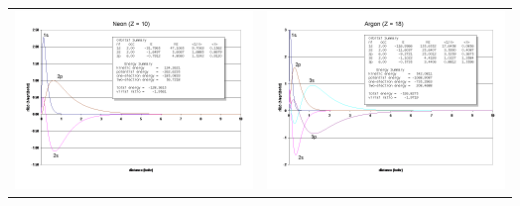 \documentclass[11pt]{article}
\begin{document}
\begin{table}[]
\begin{tabular}{cc}
\includegraphics[scale=0.33]{Images/Slide3.png} & \includegraphics[scale=0.33]{Images/Slide4.png} \\

\end{tabular}
\end{table}
\end{document}
